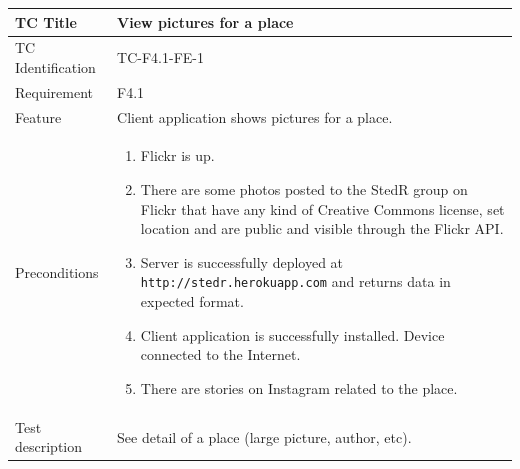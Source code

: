 \documentclass[11pt]{book}
\begin{document}
\begin{table}
  \begin{tabular}{| p{3cm} | p{9.5cm} |} \hline 
    TC Title              & View pictures for a place \\ \hline 
    TC Identification     & TC-F4.1-FE-1 \\ \hline 
    Requirement           & F4.1 \\ \hline 
    Feature               & Client application shows pictures for a place. \\ \hline 
    Preconditions         & \begin{enumerate}
                              \item Flickr is up.
                              \item There are some photos posted to the StedR group on Flickr that have any kind of
                               Creative Commons license, set location and are public and visible through the Flickr API.
                              \item Server is successfully deployed at \texttt{http://stedr.herokuapp.com} and returns data in expected format.
                              \item Client application is successfully installed. Device connected to the Internet.
                              \item There are stories on Instagram related to the place. %
                            \end{enumerate} \\ \hline 

    Test description      & See detail of a place (large picture, author, etc).


\end{tabular}
\end{table}
\end{document}
